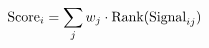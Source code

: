 \documentclass[preview]{standalone}
\begin{document}
\begin{align*}
\special{dvisvgm:raw <g id='unique000'>}\text{Score}_i = \sum_j w_j \cdot \text{Rank}(\text{Signal}_{ij})\special{dvisvgm:raw </g>}
\end{align*}
\end{document}
